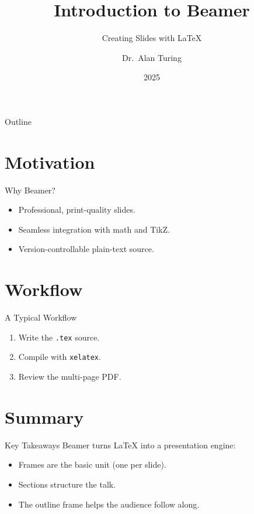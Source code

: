 \documentclass{beamer}
\title{Introduction to Beamer}
\subtitle{Creating Slides with LaTeX}
\author{Dr.~Alan Turing}
\institute{University of Computing}
\date{2025}
\begin{document}
\begin{frame}
  \titlepage
\end{frame}

\begin{frame}{Outline}
  \tableofcontents
\end{frame}

\section{Motivation}

\begin{frame}{Why Beamer?}
  \begin{itemize}
    \item Professional, print-quality slides.
    \item Seamless integration with math and TikZ.
    \item Version-controllable plain-text source.
  \end{itemize}
\end{frame}

\section{Workflow}

\begin{frame}{A Typical Workflow}
  \begin{enumerate}
    \item Write the \texttt{.tex} source.
    \item Compile with \texttt{xelatex}.
    \item Review the multi-page PDF.
  \end{enumerate}
\end{frame}

\section{Summary}

\begin{frame}{Key Takeaways}
  Beamer turns LaTeX into a presentation engine:
  \begin{itemize}
    \item Frames are the basic unit (one per slide).
    \item Sections structure the talk.
    \item The outline frame helps the audience follow along.
  \end{itemize}
\end{frame}
\end{document}
